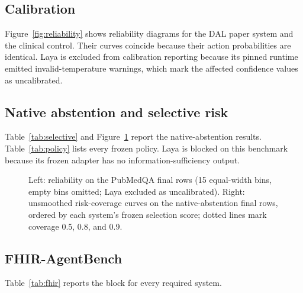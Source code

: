 \documentclass[11pt]{article}
\begin{document}


\subsection{Calibration}

Figure~\ref{fig:reliability} shows reliability diagrams for the DAL paper system and the clinical control.
Their curves coincide because their action probabilities are identical. Laya is excluded from calibration
reporting because its pinned runtime emitted invalid-temperature warnings, which mark the affected
confidence values as uncalibrated.

\subsection{Native abstention and selective risk}

Table~\ref{tab:selective} and Figure~\ref{fig:riskcoverage} report the native-abstention results.
  Table~\ref{tab:policy} lists every frozen policy. Laya is blocked on
this benchmark because its frozen adapter has no information-sufficiency output.




\begin{figure}[t]
\centering
\begin{minipage}{0.49\linewidth}\centering\end{minipage}
\begin{minipage}{0.49\linewidth}\centering\end{minipage}
\caption{Left: reliability on the PubMedQA final rows (15 equal-width bins, empty bins omitted; Laya
excluded as uncalibrated). Right: unsmoothed risk-coverage curves on the native-abstention final rows,
ordered by each system's frozen selection score; dotted lines mark coverage 0.5, 0.8, and 0.9.}
\label{fig:reliability}
\label{fig:riskcoverage}
\end{figure}

\subsection{FHIR-AgentBench}

 Table~\ref{tab:fhir} reports the block for every required system.


\end{document}
